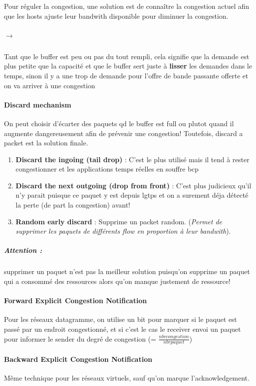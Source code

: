 Pour réguler la congestion, une solution est de connaître la congestion actuel afin que
les hosts ajuste leur bandwith disponible pour diminuer la congestion.

\subparagraph{$\to$} Tant que le buffer est peu ou pas du tout rempli, cela signifie que la demande est plus petite que la capacité et que le buffer sert juste à \textbf{lisser} les demandes dans le temps, sinon il y a une trop de demande pour l'offre de bande passante offerte et on va
arriver à une congestion


\paragraph{Discard mechanism}
On peut choisir d'écarter des paquets qd le buffer est full ou plutot quand il
augmente dangereusement afin de prévenir une congestion!
Toutefois, discard a packet est la solution finale.

\begin{enumerate}
    \item \textbf{Discard the ingoing (tail drop)} : C'est le plus utilisé mais il tend à rester congestionner et
        les applications temps réelles en souffre bcp
    \item \textbf{Discard the next outgoing (drop from front)} : C'est plus judicieux qu'il n'y parait puisque ce paquet
        y est depuis lgtps et on a surement déja détecté la perte (de part la congestion) avant!
    \item \textbf{Random early discard} : Supprime un packet random. (\textit{Permet de supprimer les paquets de différents flow en proportion à leur bandwith}).
\end{enumerate}

\subparagraph{Attention :} supprimer un paquet n'est pas la meilleur solution puisqu'on supprime un paquet qui a consommé des ressources alors qu'on manque justement de ressource!

\paragraph{Forward Explicit Congestion Notification}
Pour les réseaux datagramme,
on utilise un bit pour marquer si le paquet est passé par un endroit congestionné,
et si c'est le cas le receiver envoi un paquet pour informer le sender du degré
de congestion (= $\frac{nbr congestion}{nbr paquet}$)

\paragraph{Backward Explicit Congestion Notification}
Même technique pour les réseaux virtuels, sauf qu'on marque l'acknowledgement.

